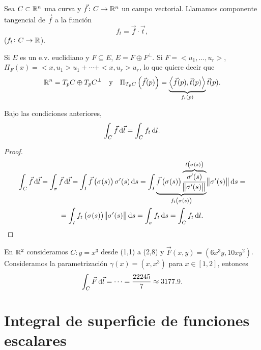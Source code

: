 \begin{defi}
    Sea $C \subset \mathbb{R}^n$ una curva y $\vec{f} \colon C \to \mathbb{R}^n$ un campo vectorial. Llamamos componente tangencial de $\vec{f}$ a
    la función
    \[
        f_t = \vec{f} \cdot \vec{t},
    \]
    ($f_t \colon C \to \mathbb{R}$).
\end{defi}

\begin{obs*}
    Si $E$ es un e.v. euclidiano y $F \subseteq E$, $E = F \oplus F^\perp$. Si $F = <u_1, \dots, u_r>$, $\Pi_F(x) = <x,u_1>u_1 + \cdots + <x,u_r>u_r$, lo
    que quiere decir que
    \[
        \mathbb{R}^n = T_pC \oplus T_pC^\perp \quad \text{y} \quad \Pi_{T_pC} \left( \vec{f}(p) \right) =\underbrace{\left< \vec{f}(p), \vec{t}(p) \right>}_{f_t(p)}\vec{t}(p).
    \]
\end{obs*}

\begin{prop}
    Bajo las condiciones anteriores,
    \[
        \int_C \vec{f} \dif \vec{l} = \int_C f_t \dif l.
    \]
\end{prop}

\begin{proof}
    \begin{gather*}
        \int_C \vec{f} \dif \vec{l} = \int_\sigma \vec{f} \dif \vec{l} = \int_I \vec{f}\left( \sigma(s) \right)\sigma^\prime(s) \dif s =
        \int_I \underbrace{\vec{f}\left( \sigma(s) \right) \overbrace{\frac{\sigma^\prime(s)}{\norm{\sigma^\prime(s)}}}^{\vec{t}\left( \sigma(s) \right)}}_
        {f_t\left( \sigma(s) \right)} \norm{\sigma^\prime(s)} \dif s = \\ = \int_I f_t\left( \sigma(s) \right) \norm{\sigma^\prime(s)} \dif s =
        \int_\sigma f_t \dif s = \int_C f_t \dif l.
    \end{gather*}
\end{proof}

\begin{example*}
    En $\mathbb{R}^2$ consideramos $C \colon y = x^3$ desde (1,1) a (2,8) y $\vec{F}(x, y) = \left( 6x^3y, 10xy^2 \right)$. Consideramos
    la parametrización $\gamma(x) = \left( x,x^3 \right)$ para $x \in [1,2]$, entonces
    \[
        \int_C \vec{F} \dif \vec{l} = \cdots = \frac{22245}{7} \approx 3177.9.
    \]
\end{example*}

\section{Integral de superficie de funciones escalares}

